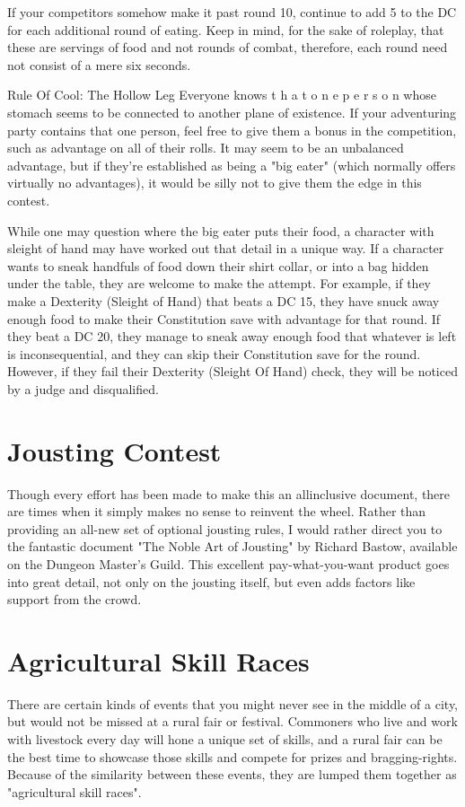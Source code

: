 \documentclass[10pt,a4paper,twoside,bg=print,twocolumn,openany,nodeprecatedcode]{dndbook}
\begin{document}
If your competitors somehow make it past round 10, continue to add 5 to the DC for each additional round of eating. Keep in mind, for the sake of roleplay, that these are servings of food and not rounds of combat, therefore, each round need not consist of a mere six seconds.
\begin{DndSidebar}[float=!b]{Rule Of Cool: The Hollow Leg}
Everyone knows t h a t o n e p e r s o n whose stomach seems to be connected to another plane of existence. If your adventuring party contains that one person, feel free to give them a bonus in the competition, such as advantage on all of their rolls. It may seem to be an unbalanced advantage, but if they're established as being a "big eater" (which normally offers virtually no advantages), it would be silly not to give them the edge in this contest.


While one may question where the big eater puts their food, a character with sleight of hand may have worked out that detail in a unique way. If a character wants to sneak handfuls of food down their shirt collar, or into a bag hidden under the table, they are welcome to make the attempt. For example, if they make a Dexterity (Sleight of Hand) that beats a DC 15, they have snuck away enough food to make their Constitution save with advantage for that round. If they beat a DC 20, they manage to sneak away enough food that whatever is left is inconsequential, and they can skip their Constitution save for the round. However, if they fail their Dexterity (Sleight Of Hand) check, they will be noticed by a judge and disqualified.


\end{DndSidebar}

\section{Jousting Contest}
Though every effort has been made to make this an allinclusive document, there are times when it simply makes no sense to reinvent the wheel. Rather than providing an all-new set of optional jousting rules, I would rather direct you to the fantastic document "The Noble Art of Jousting" by Richard Bastow, available on the Dungeon Master's Guild. This excellent pay-what-you-want product goes into great detail, not only on the jousting itself, but even adds factors like support from the crowd. 
\section{Agricultural Skill Races}
There are certain kinds of events that you might never see in the middle of a city, but would not be missed at a rural fair or festival. Commoners who live and work with livestock every day will hone a unique set of skills, and a rural fair can be the best time to showcase those skills and compete for prizes and bragging-rights. Because of the similarity between these events, they are lumped them together as "agricultural skill races".
\end{document}
